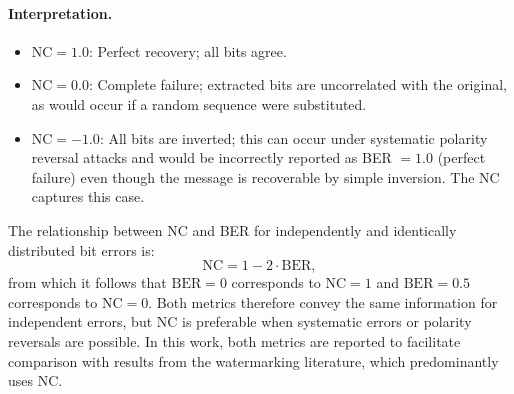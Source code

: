 \documentclass[12pt,a4paper,oneside]{report}
\begin{document}
	\paragraph{Interpretation.}
	\begin{itemize}
		\item $\mathrm{NC} = 1.0$: Perfect recovery; all bits agree.
		\item $\mathrm{NC} = 0.0$: Complete failure; extracted bits are uncorrelated with the
		original, as would occur if a random sequence were substituted.
		\item $\mathrm{NC} = -1.0$: All bits are inverted; this can occur under systematic polarity
		reversal attacks and would be incorrectly reported as BER $= 1.0$ (perfect failure) even
		though the message is recoverable by simple inversion. The NC captures this case.
	\end{itemize}
	
	The relationship between NC and BER for independently and identically distributed bit errors is:
	\begin{equation}
		\mathrm{NC} = 1 - 2 \cdot \mathrm{BER},
		\label{eq:nc_ber_relationship}
	\end{equation}
	from which it follows that $\mathrm{BER} = 0$ corresponds to $\mathrm{NC} = 1$ and
	$\mathrm{BER} = 0.5$ corresponds to $\mathrm{NC} = 0$. Both metrics therefore convey the same
	information for independent errors, but NC is preferable when systematic errors or polarity
	reversals are possible. In this work, both metrics are reported to facilitate comparison with
	results from the watermarking literature, which predominantly uses NC.
	
\end{document}
